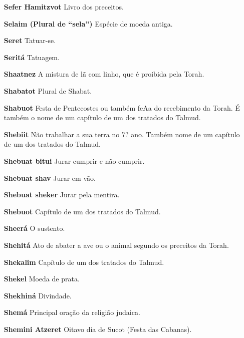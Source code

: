 \begin{itemize}
\item[\textbf{Sefer Hamitzvot}] Livro dos precei­tos.

\item[\textbf{Selaim (Plural de ``sela'')}] Espécie de moeda antiga.

\item[\textbf{Seret}] Tatuar-se.

\item[\textbf{Seritá}] Tatuagem.

\item[\textbf{Shaatnez}] A mistura de lã com linho, que é proibida pela
Torah.

\item[\textbf{Shabatot}] Plural de Shabat.

\item[\textbf{Shabuot}] Festa de Pentecostes ou também feAa do recebimento da To­rah. É também o nome de um capítu­lo de um dos tratados do Talmud.

\item[\textbf{Shebiit}] Não trabalhar a sua terra no 7? ano. Também nome de um capítu­lo de um dos
tratados do Talmud.

\item[\textbf{Shebuat bitui}] Jurar cumprir e não cumprir.

\item[\textbf{Shebuat shav}] Jurar em vão.

\item[\textbf{Shebuat sheker}] Jurar pela mentira.

\item[\textbf{Shebuot}] Capítulo de um dos trata­dos do Talmud.

\item[\textbf{Sheerá}] O sustento.

\item[\textbf{Shehitá}] Ato de abater a ave ou o ani­mal segundo os preceitos
da Torah.

\item[\textbf{Shekalim}] Capítulo de um dos trata­dos do Talmud.

\item[\textbf{Shekel}] Moeda de prata.

\item[\textbf{Shekhiná}] Divindade.

\item[\textbf{Shemá}] Principal oração da religião judaica.

\item[\textbf{Shemini Atzeret}] Oitavo dia de Su­cot (Festa das Cabanas).


\end{itemize}
